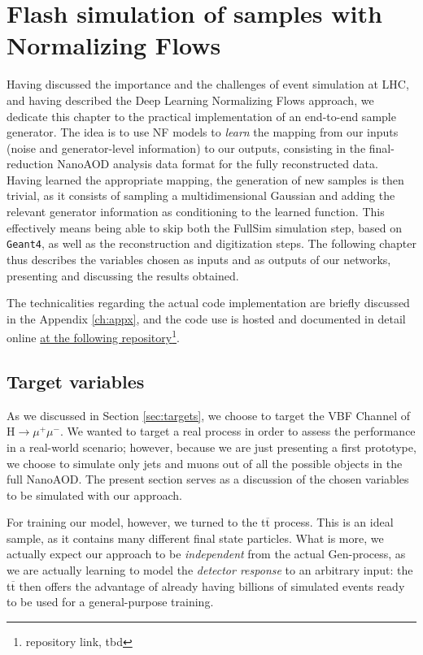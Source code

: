 \chapter{Flash simulation of samples with Normalizing Flows}\label{ch:fs} %

Having discussed the importance and the challenges of event simulation at LHC, and having described the Deep Learning Normalizing Flows approach, we dedicate this chapter to the practical implementation of an end-to-end sample generator.
The idea is to use NF models to \emph{learn} the mapping from our inputs (noise and generator-level information) to our outputs, consisting in the final-reduction NanoAOD analysis data format for the fully reconstructed data. Having learned the appropriate mapping, the generation of new samples is then trivial, as it consists of sampling a multidimensional Gaussian and adding the relevant generator information as conditioning to the learned function. This effectively means being able to skip both the FullSim simulation step, based on \texttt{Geant4}, as well as the reconstruction and digitization steps. The following chapter thus describes the variables chosen as inputs and as outputs of our networks, presenting and discussing the results obtained.

The technicalities regarding the actual code implementation are briefly discussed in the Appendix \ref{ch:appx}, and the code use is hosted and documented in detail online \href{tbd}{at the following repository}\footnote{repository link, tbd}.

\section{Target variables}

As we discussed in Section \ref{sec:targets}, we choose to target the VBF Channel of H$\rightarrow\mu^+\mu^-$. We wanted to target a real process in order to assess the performance in a real-world scenario; however, because we are just presenting a first prototype, we choose to simulate only jets and muons out of all the possible objects in the full NanoAOD. The present section serves as a discussion of the chosen variables to be simulated with our approach.

For training our model, however, we turned to the t$\overline{\text{t}}$ process. This is an ideal sample, as it contains many different final state particles. What is more, we actually expect our approach to be \emph{independent} from the actual Gen-process, as we are actually learning to model the \emph{detector response} to an arbitrary input: the t$\overline{\text{t}}$ then offers the advantage of already having billions of simulated events ready to be used for a general-purpose training.

